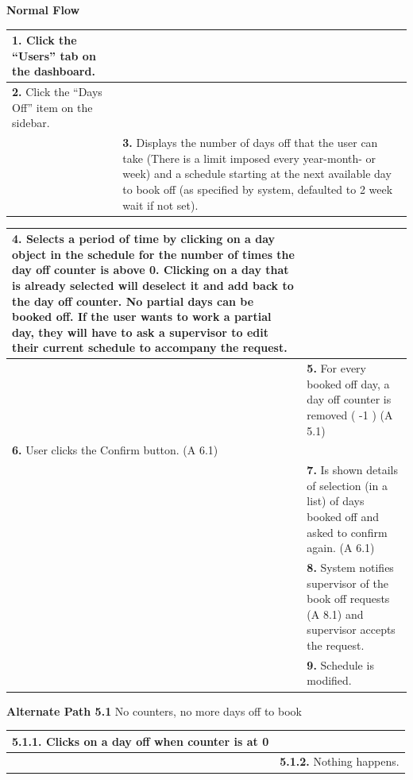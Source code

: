 \documentclass[letterpaper,12pt]{report}
\begin{document}
{ \centering \textbf{Normal Flow}
\begin{center}
\xuchead
\begin{tabular}{| p{8.5cm} | p{8.5cm} |}
\hline
\textbf{1.} Click the ``Users'' tab on the dashboard. & \\
\hline
\textbf{2.} Click the ``Days Off'' item on the sidebar. & \\
\hline
& \textbf{3.} Displays the number of days off that the user can take (There is a limit imposed every year-month- or week) and a schedule starting at the next available day to book off (as specified by system\index{system}, defaulted to 2 week wait if not set). \\
\hline
\end{tabular}
\end{center}
\pagebreak

\begin{center}
\xuchead
\begin{tabular}{| p{8.5cm} | p{8.5cm} |}
\hline
\textbf{4.} Selects a period of time by clicking on a day object in the schedule for the number of times the day off counter is above 0. Clicking on a day that is already selected will deselect it and add back to the day off counter. No partial days can be booked off. If the user wants to work a partial day, they will have to ask a supervisor to edit their current schedule to accompany the request. \\
\hline
& \textbf{5.} For every booked off day, a day off counter is removed ( -1 ) (A 5.1) \\
\hline
\textbf{6.} User clicks the Confirm button. (A 6.1) & \\
\hline
& \textbf{7.} Is shown details of selection (in a list) of days booked off and asked to confirm again. (A 6.1) \\
\hline
& \textbf{8.} System\index{system} notifies supervisor of the book off requests (A 8.1) and supervisor accepts the request. \\
\hline
& \textbf{9.} Schedule is modified. \\
\hline
\end{tabular}
\end{center}

\centering \textbf{Alternate Path 5.1}
\linebreak No counters, no more days off to book
\begin{center}
\xuchead
\begin{tabular}{| p{8.5cm} | p{8.5cm} |}
\hline
\textbf{5.1.1.} Clicks on a day off when counter is at 0 & \\
\hline
& \textbf{5.1.2.} Nothing happens. \\
\hline
\end{tabular}
\end{center}


}
\end{document}
